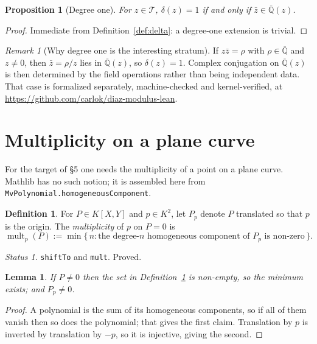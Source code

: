 \documentclass[11pt]{article}
\theoremstyle{plain}
\newtheorem{lemma}[theorem]{Lemma}
\newtheorem{proposition}[theorem]{Proposition}
\theoremstyle{definition}
\newtheorem{definition}[theorem]{Definition}
\theoremstyle{remark}
\newtheorem*{remark}{Remark}
\newtheorem*{status}{Status}
\newcommand{\Q}{\mathbb{Q}}
\newcommand{\Alg}{\overline{\Q}}
\newcommand{\Tc}{\mathcal{T}}
\newcommand{\lean}[1]{\textup{\texttt{#1}}}
\begin{document}
\begin{proposition}[Degree one]\label{prop:deg1}
For $z\in\Tc$, $\delta(z)=1$ if and only if $\bar z\in\Alg(z)$.
\end{proposition}

\begin{proof}
Immediate from Definition~\ref{def:delta}: a degree-one extension is trivial.
\end{proof}

\begin{remark}[Why degree one is the interesting stratum]
If $z\bar z=\rho$ with $\rho\in\Alg$ and $z\ne0$, then $\bar z=\rho/z$ lies in
$\Alg(z)$, so $\delta(z)=1$. Complex conjugation on $\Alg(z)$ is then
determined by the field operations rather than being independent data. That
case is formalized separately, machine-checked and kernel-verified, at
\url{https://github.com/carlok/diaz-modulus-lean}.
\end{remark}

\section{Multiplicity on a plane curve}

For the target of \S5 one needs the multiplicity of a point on a plane curve.
Mathlib has no such notion; it is assembled here from
\lean{MvPolynomial.homogeneousComponent}.

\begin{definition}\label{def:mult}
For $P\in K[X,Y]$ and $p\in K^2$, let $P_p$ denote $P$ translated so that $p$
is the origin. The \emph{multiplicity} of $p$ on $P=0$ is
\[
  \operatorname{mult}_p(P):=\min\{\,n:\text{the degree-$n$ homogeneous
  component of }P_p\text{ is non-zero}\,\}.
\]
\end{definition}

\begin{status}
\lean{shiftTo} and \lean{mult}. Proved.
\end{status}

\begin{lemma}\label{lem:mult-wd}
If $P\ne0$ then the set in Definition~\ref{def:mult} is non-empty, so the
minimum exists; and $P_p\ne0$.
\end{lemma}

\begin{proof}
A polynomial is the sum of its homogeneous components, so if all of them
vanish then so does the polynomial; that gives the first claim. Translation by
$p$ is inverted by translation by $-p$, so it is injective, giving the second.
\end{proof}
\end{document}
